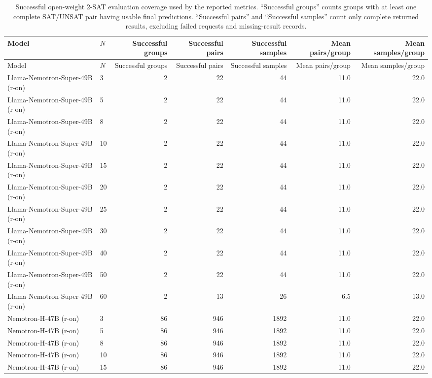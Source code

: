 \documentclass[conference]{IEEEtran}
\theoremstyle{remark}
\begin{document}
\setlength{\LTleft}{0pt}
\setlength{\LTright}{0pt}
\begin{longtable}{llrrrrr}
\caption{Successful open-weight 2-SAT evaluation coverage used by the reported metrics.
``Successful groups'' counts groups with at least one complete SAT/UNSAT pair having usable final predictions.
``Successful pairs'' and ``Successful samples'' count only complete returned results, excluding failed requests and missing-result records.}
\label{tab:open_2sat_success_counts}\\
\toprule
Model & $N$ & Successful groups & Successful pairs & Successful samples & Mean pairs/group & Mean samples/group \\
\midrule
\endfirsthead
\toprule
Model & $N$ & Successful groups & Successful pairs & Successful samples & Mean pairs/group & Mean samples/group \\
\midrule
\endhead
\bottomrule
\endfoot
Llama-Nemotron-Super-49B (r-on) & 3 & 2 & 22 & 44 & 11.0 & 22.0 \\
Llama-Nemotron-Super-49B (r-on) & 5 & 2 & 22 & 44 & 11.0 & 22.0 \\
Llama-Nemotron-Super-49B (r-on) & 8 & 2 & 22 & 44 & 11.0 & 22.0 \\
Llama-Nemotron-Super-49B (r-on) & 10 & 2 & 22 & 44 & 11.0 & 22.0 \\
Llama-Nemotron-Super-49B (r-on) & 15 & 2 & 22 & 44 & 11.0 & 22.0 \\
Llama-Nemotron-Super-49B (r-on) & 20 & 2 & 22 & 44 & 11.0 & 22.0 \\
Llama-Nemotron-Super-49B (r-on) & 25 & 2 & 22 & 44 & 11.0 & 22.0 \\
Llama-Nemotron-Super-49B (r-on) & 30 & 2 & 22 & 44 & 11.0 & 22.0 \\
Llama-Nemotron-Super-49B (r-on) & 40 & 2 & 22 & 44 & 11.0 & 22.0 \\
Llama-Nemotron-Super-49B (r-on) & 50 & 2 & 22 & 44 & 11.0 & 22.0 \\
Llama-Nemotron-Super-49B (r-on) & 60 & 2 & 13 & 26 & 6.5 & 13.0 \\
Nemotron-H-47B (r-on) & 3 & 86 & 946 & 1892 & 11.0 & 22.0 \\
Nemotron-H-47B (r-on) & 5 & 86 & 946 & 1892 & 11.0 & 22.0 \\
Nemotron-H-47B (r-on) & 8 & 86 & 946 & 1892 & 11.0 & 22.0 \\
Nemotron-H-47B (r-on) & 10 & 86 & 946 & 1892 & 11.0 & 22.0 \\
Nemotron-H-47B (r-on) & 15 & 86 & 946 & 1892 & 11.0 & 22.0 \\

\end{longtable}
\end{document}
